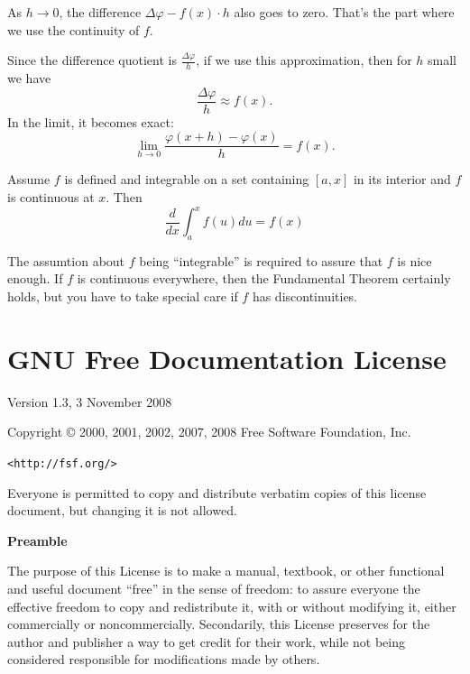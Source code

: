 \documentclass[11pt]{book}
\numberwithin{example}{chapter}
\begin{document}
As $h\to 0$, the difference $\Delta \varphi - f(x)\cdot h$ also goes to zero.  That's the part where we use the continuity of $f$.  

Since the difference quotient is $\frac{\Delta \varphi}{h}$, if we use this approximation, then for $h$ small we have 
$$\frac{\Delta \varphi}{h}\approx f(x).$$
In the limit, it becomes exact: $$\lim_{h\to 0}\frac{\varphi(x+h)-\varphi(x)}{h}=f(x).$$

\begin{theorem} Assume $f$ is defined and integrable on a set containing $[a,x]$ in its interior and $f$ is continuous at $x$.  Then
$$\frac{d}{dx}\int_a^x f(u)du = f(x)$$
\end{theorem}


The assumtion about $f$ being ``integrable'' is required to assure that $f$ is nice enough. If $f$ is continuous everywhere, then the Fundamental Theorem certainly holds, but you have to take special care if $f$ has discontinuities.  


\chapter*{GNU Free Documentation License}


 \begin{center}

       Version 1.3, 3 November 2008


 Copyright \copyright{} 2000, 2001, 2002, 2007, 2008  Free Software Foundation, Inc.
 
 \bigskip
 
     \texttt{<http://fsf.org/>}
  
 \bigskip
 
 Everyone is permitted to copy and distribute verbatim copies
 of this license document, but changing it is not allowed.
\end{center}


\begin{center}
{\bf\large Preamble}
\end{center}

The purpose of this License is to make a manual, textbook, or other
functional and useful document ``free'' in the sense of freedom: to
assure everyone the effective freedom to copy and redistribute it,
with or without modifying it, either commercially or noncommercially.
Secondarily, this License preserves for the author and publisher a way
to get credit for their work, while not being considered responsible
for modifications made by others.
\end{document}
